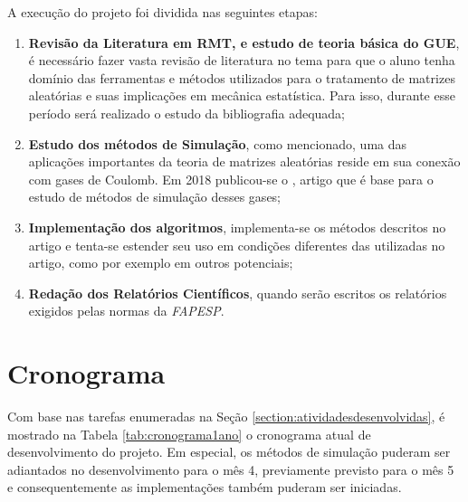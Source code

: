 \documentclass[12pt]{report}
\begin{document}
A execução do projeto foi dividida nas seguintes etapas:

\begin{enumerate}
	\item \textbf{Revisão da Literatura em RMT, e estudo de teoria básica do GUE}, é necessário fazer vasta revisão de literatura no tema para que o aluno tenha domínio das ferramentas e métodos utilizados para o tratamento de matrizes aleatórias e suas implicações em mecânica estatística. Para isso, durante esse período será realizado o estudo da bibliografia adequada;
	
	\item \textbf{Estudo dos métodos de Simulação}, como mencionado, uma das aplicações importantes da teoria de matrizes aleatórias reside em sua conexão com gases de Coulomb. Em 2018 publicou-se o \cite{Chafa__2018}, artigo que é base para o estudo de métodos de simulação desses gases;
	
	\item \textbf{Implementação dos algoritmos}, implementa-se os métodos descritos no artigo e tenta-se estender seu uso em condições diferentes das utilizadas no artigo, como por exemplo em outros potenciais;
	
	\item \textbf{Redação dos Relatórios Científicos}, quando serão escritos os relatórios exigidos pelas normas da \textit{FAPESP}.
	
\end{enumerate}

\section{Cronograma}

Com base nas tarefas enumeradas na Seção \ref{section:atividadesdesenvolvidas}, é mostrado na Tabela \ref{tab:cronograma1ano} o cronograma atual de desenvolvimento do projeto. Em especial, os métodos de simulação puderam ser adiantados no desenvolvimento para o mês 4, previamente previsto para o mês 5 e consequentemente as implementações também puderam ser iniciadas.

\end{document}
